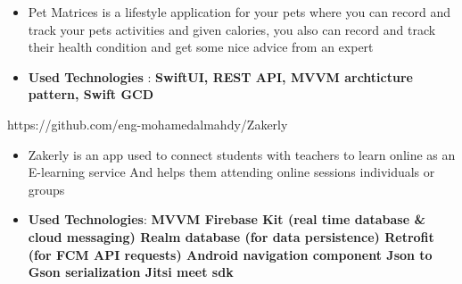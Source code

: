 \documentclass[10pt,a4paper,ragged2e,withhyper]{altacv}
\begin{document}
\begin{paracol}{1}
        {\cvrepo{|\faLock\faApple}
        {}}{}{}
        \begin{itemize}
            \item \textbf{}Pet Matrices is a lifestyle application for your pets where you can record and track your pets activities and given calories, you also can record and track their health condition and get some nice advice from an expert
            \item \textbf{Used Technologies} : \textbf{SwiftUI, REST API, MVVM archticture pattern, Swift GCD}
        \end{itemize}
        \divider
        {\cvrepo{|\faGithub\faAndroid}
        {https://github.com/eng-mohamedalmahdy/Zakerly}}{}{}
        \begin{itemize}
            \item \textbf{}Zakerly is an app used to connect students with teachers to learn online as an E-learning service And helps them attending online sessions individuals or groups
            \item \textbf{Used Technologies}: \textbf{MVVM
            Firebase Kit (real time database \& cloud messaging)
                Realm database (for data persistence)
                Retrofit (for FCM API requests)
                Android navigation component
                Json to Gson serialization
                Jitsi meet sdk}
        \end{itemize}
        \divider




\end{paracol}
\end{document}
